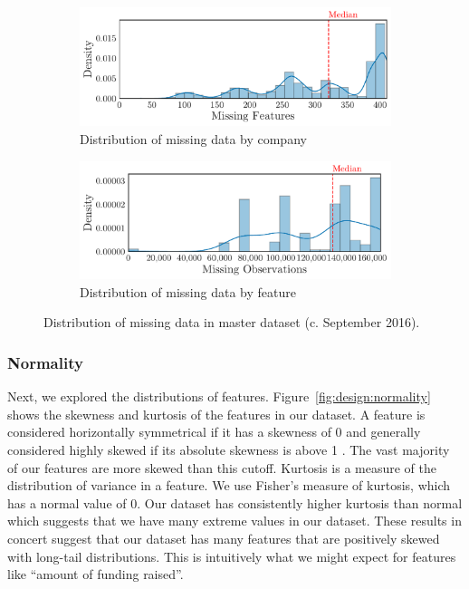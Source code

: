 \documentclass[../thesis/thesis.tex]{subfiles}
\begin{document}
\begin{figure}[!htb]
    \centering
    \begin{subfigure}{\textwidth}
        \includegraphics[width=\textwidth]{../figures/design/sparsity_features}
        \caption[Sparsity by company]{Distribution of missing data by company}
        \label{fig:design:sparsity:features}
    \end{subfigure}
    \begin{subfigure}{\textwidth}
        \includegraphics[width=\textwidth]{../figures/design/sparsity_observations}
        \caption[Sparsity by feature]{Distribution of missing data by feature}
        \label{fig:design:sparsity:observations}
    \end{subfigure}
    \caption[Dataset sparsity]{Distribution of missing data in master dataset (c. September 2016).}
    \label{fig:design:sparsity}
\end{figure}

\subsubsection{Normality}

Next, we explored the distributions of features. Figure~\ref{fig:design:normality} shows the skewness and kurtosis of the features in our dataset. A feature is considered horizontally symmetrical if it has a skewness of 0 and generally considered highly skewed if its absolute skewness is above 1 \cite{bulmer1979}. The vast majority of our features are more skewed than this cutoff. Kurtosis is a measure of the distribution of variance in a feature. We use Fisher's measure of kurtosis, which has a normal value of 0. Our dataset has consistently higher kurtosis than normal which suggests that we have many extreme values in our dataset. These results in concert suggest that our dataset has many features that are positively skewed with long-tail distributions. This is intuitively what we might expect for features like ``amount of funding raised''.
\end{document}
